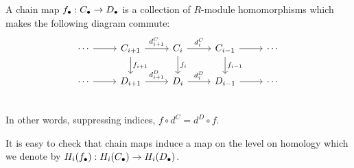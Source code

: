 \begin{definition}
    A chain map $f_\bullet: C_\bullet \to  D_\bullet$ is a collection of $R$-module homomorphisms which makes the following diagram commute:
    \[
        \begin{tikzcd}
            \cdots  \arrow[r, ""]&
            C_{i+1} \arrow[r, "d_{i+1}^{C}"] \arrow[d, "f_{i+1}"]&
            C_{i} \arrow[r, "d_{i}^{C}"] \arrow[d, "f_i"]&
            C_{i-1} \arrow[r, ""] \arrow[d, "f_{i-1}"]&
            \cdots \\
            \cdots  \arrow[r, ""]&
            D_{i+1} \arrow[r, "d_{i+1}^{D}"] &
            D_{i} \arrow[r, "d_{i}^{D}"] &
            D_{i-1} \arrow[r, ""] &
            \cdots \\
        \end{tikzcd}
    \]
    In other words, suppressing indices, $f  \circ  d^{C} = d^{D}  \circ f$.
\end{definition}

It is easy to check that chain maps induce a map on the level on homology which we denote by $H_i(f_\bullet): H_i(C_\bullet) \to  H_i(D_\bullet)$.

